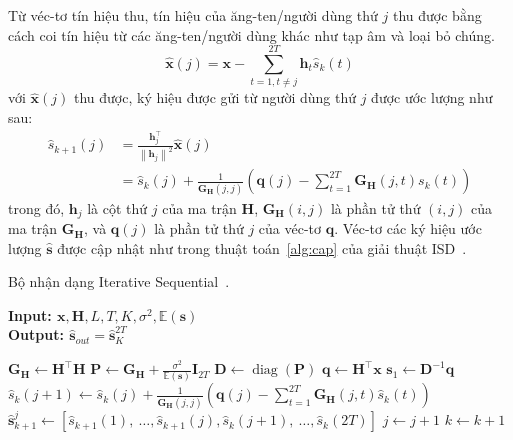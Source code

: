 Từ véc-tơ tín hiệu thu, tín hiệu của ăng-ten/người dùng thứ $j$ thu được bằng cách coi tín hiệu từ các ăng-ten/người dùng khác như tạp âm và loại bỏ chúng.
\begin{equation}
    \hat{\mathbf{x}}(j)=\mathbf{x}-\sum_{t=1, t \neq j}^{2T} \mathbf{h}_t \hat{s}_k(t)
\end{equation}
với $\hat{\mathbf{x}}(j)$ thu được, ký hiệu được gửi từ người dùng thứ $j$ được ước lượng như sau:
\begin{equation}
\label{eq:supdate}
    \begin{aligned}
        \hat{s}_{k+1}(j) & =\frac{\mathbf{h}_j^\top}{\left\|\mathbf{h}_j\right\|^2} \hat{\mathbf{x}}(j) \\ 
        & = \hat{s}_k(j)+\frac{1}{\mathbf{G}_\mathbf{H}(j, j)}\left(\mathbf{q}(j)-\sum_{t=1}^{2T} \mathbf{G}_\mathbf{H}(j, t) s_k(t)\right)
    \end{aligned}
\end{equation}
trong đó, $\mathbf{h}_j$ là cột thứ $j$ của ma trận $\mathbf{H}$, $\mathbf{G}_\mathbf{H}(i, j)$ là phần tử thứ $(i, j)$ của ma trận $\mathbf{G}_\mathbf{H}$, và $\mathbf{q}(j)$ là phần tử thứ $j$ của véc-tơ $\mathbf{q}$. Véc-tơ các ký hiệu ước lượng $\hat{\mathbf{s}}$ được cập nhật như trong thuật toán~\ref{alg:cap} của giải thuật ISD~\cite{Mandloi2017}. 
\begin{algorithm}[ht]
    \caption{Bộ nhận dạng Iterative Sequential~\cite{Mandloi2017}.}\label{alg:cap}
    \hspace*{\algorithmicindent} \textbf{Input: $\mathbf{x}, \mathbf{H}, L, T, K, \sigma^2, \mathbb{E}(\mathbf{s})$} \\
    \hspace*{\algorithmicindent} \textbf{Output: $\hat{\mathbf{s}}_{out} = \hat{\mathbf{s}}^{2T}_K$} 
    \begin{algorithmic}[1]
        \State $\mathbf{G}_\mathbf{H} \leftarrow \mathbf{H}^\top \mathbf{H}$
        \State $\mathbf{P} \leftarrow \mathbf{G}_\mathbf{H} + \frac{\sigma^2}{\mathbb{E}(\mathbf{s})} \mathbf{I}_{2T}$
        \State $\mathbf{D} \leftarrow \operatorname{diag}(\mathbf{P})$
        \State $\mathbf{q} \leftarrow \mathbf{H}^\top \mathbf{x}$
        \State $\mathbf{s}_1 \leftarrow \mathbf{D}^{-1} \mathbf{q}$ \\
                \State $\hat{s}_k(j+1) \leftarrow \hat{s}_k(j)+\frac{1}{\mathbf{G}_\mathbf{H}(j, j)}\left(\mathbf{q}(j)-\sum_{t=1}^{2T} \mathbf{G}_\mathbf{H}(j, t) \hat{s}_k(t)\right)$ \\ 
                \State $\hat{\mathbf{s}}_{k+1}^j \leftarrow\left[\hat{s}_{k+1}(1),~\ldots, \hat{s}_{k+1}(j), \hat{s}_k(j+1),~\ldots, \hat{s}_k(2T)\right]$
                \State $j \leftarrow j + 1$
            \EndFor
            \State $k \leftarrow k + 1$
        \EndFor
    \end{algorithmic}
\end{algorithm}

